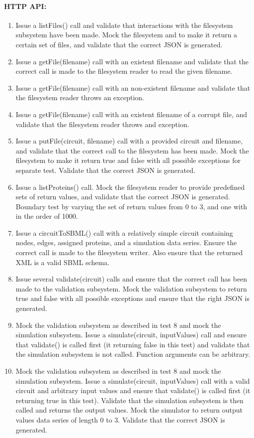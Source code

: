 \paragraph{HTTP API:
}\begin{enumerate}
\item Issue a listFiles() call and validate that interactions with the filesystem subsystem have been made. Mock the filesystem and to make it return a certain set of files, and validate that the correct JSON is generated.
\item Issue a getFile(filename) call with an existent filename and validate that the correct call is made to the filesystem reader to read the given filename.
\item Issue a getFile(filename) call with an non-existent filename and validate that the filesystem reader throws an exception.
\item Issue a getFile(filename) call with an existent filename of a corrupt file, and validate that the filesystem reader throws and exception.
\item Issue a putFile(circuit, filename) call with a provided circuit and filename, and validate  that the correct call to the filesystem has been made. Mock the filesystem to make it return true and false with all possible exceptions for separate test. Validate that the correct JSON is generated.\item Issue a listProteins() call. Mock the filesystem reader to provide predefined sets of return values, and validate that the correct JSON is generated. Boundary test by varying the set of return values from 0 to 3, and one with in the order of 1000. \item Issue a circuitToSBML() call with a relatively simple circuit containing nodes, edges, assigned proteins, and a simulation data series. Ensure the correct call is made to the filesystem writer. Also ensure that the returned XML is a valid SBML schema.\item Issue several validate(circuit) calls and ensure that the correct call has been made to the validation subsystem. Mock the validation subsystem to return true and false with all possible exceptions and ensure that the right JSON is generated.
\item Mock the validation subsystem as described in test 8 and mock the simulation subsystem. Issue a simulate(circuit, inputValues) call and ensure that validate() is called first (it returning false in this test) and validate that the simulation subsystem is not called. Function arguments can be arbitrary. 
\item Mock the validation subsystem as described in test 8 and mock the simulation subsystem. Issue a simulate(circuit, inputValues) call with a valid circuit and arbitrary input values and ensure that validate() is called first (it returning true in this test). Validate that the simulation subsystem is then called and returns the output values. Mock the simulator to return output values data series of length 0 to 3. Validate that the correct JSON is generated.\end{enumerate}
